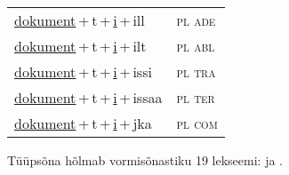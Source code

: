 \begin{minipage}{\textwidth}
\begin{sideways}
\begin{tabular}{l l}
\underline{dokument}\,+\,t\,+\,\underline{i}\,+\,ill & \textsc{ pl ade } \\
\underline{dokument}\,+\,t\,+\,\underline{i}\,+\,ilt & \textsc{ pl abl } \\
\underline{dokument}\,+\,t\,+\,\underline{i}\,+\,issi & \textsc{ pl tra } \\
\underline{dokument}\,+\,t\,+\,\underline{i}\,+\,issaa & \textsc{ pl ter } \\
\underline{dokument}\,+\,t\,+\,\underline{i}\,+\,jka & \textsc{ pl com } \\
\end{tabular}
\end{sideways}
\label{tab:tüüpsõnamall-dokumentti}

\end{minipage}

 
\vspace{1em}
\noindent Tüüpsõna hõlmab vormisõnastiku 19 lekseemi:  ja .
